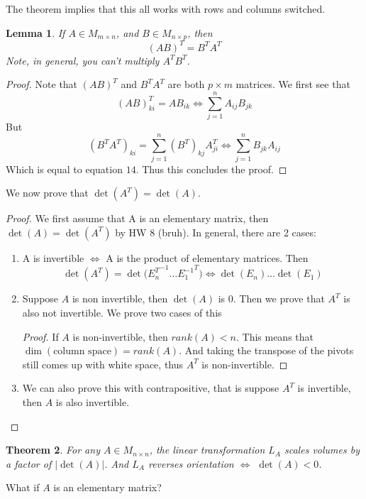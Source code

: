 \documentclass{article}
\newtheorem{theorem}{Theorem}[section]
\newtheorem{lemma}[theorem]{Lemma}
\newtheorem{one minute paper}[theorem]{One Minute Paper}
\begin{document}
The theorem implies that this all works with rows and columns switched.

\begin{lemma}
    If $A \in M_{m \times n}$, and $B \in M_{n \times p}$, then 
    \begin{equation}
        (AB)^T = B^TA^T
    \end{equation}
    Note, in general, you can't multiply $A^TB^T$. 
\end{lemma}

\begin{proof}
    Note that $(AB)^T$ and $B^TA^T$ are both $p \times m$ matrices. We first see that 
    \begin{equation}
        (AB)^T_{ki} = AB_{ik} \iff \sum_{j=1}^{n}A_{ij}B_{jk}
    \end{equation} 
    But
    \begin{equation}
        (B^TA^T)_{ki} = \sum_{j=1}^{n}(B^T)_{kj}A^{T}_{ji} \iff \sum_{j=1}^{n}B_{jk}A_{ij}
    \end{equation}
    Which is equal to equation $14$. Thus this concludes the proof. 
\end{proof}

We now prove that $\det(A^T) = \det(A)$. 

\begin{proof}
    We first assume that A is an elementary matrix, then $\det(A) = \det(A^T)$ by HW 8 (bruh). In general, there are 2 cases: 
    \begin{enumerate}
        \item A is invertible $\iff$ A is the product of elementary matrices. Then 
        \begin{equation}
            \det(A^T) = {\det(E_{n}^T}^{-1} \dots {E_1^{-1}}^T) \iff \det(E_n)\dots\det(E_1)
        \end{equation}
        \item Suppose $A$ is non invertible, then $\det(A)$ is 0. Then we prove that $A^{T}$ is also not invertible. We prove two cases of this 
        \begin{proof}
            If $A$ is non-invertible, then $rank(A) < n$. This means that $\dim(\text{column space}) = rank(A)$. And taking the transpose of the pivots still comes up with white space, thus $A^T$ is non-invertible.  
        \end{proof} 
        \item We can also prove this with contrapositive, that is suppose $A^T$ is invertible, then $A$ is also invertible. 
    \end{enumerate}
\end{proof}

\begin{theorem}
    For any $A \in M_{n \times n}$, the linear transformation $L_A$ scales volumes by a factor of $|\det(A)|$. And $L_A$ reverses orientation $\iff$ $\det(A) < 0$. 
\end{theorem}

What if $A$ is an elementary matrix? 
\end{document}
